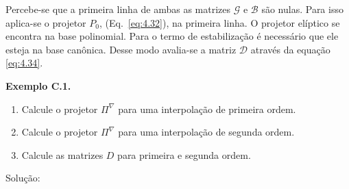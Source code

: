 \indent Percebe-se que a primeira linha de ambas as matrizes $\mathcal{G}$ e $\mathcal{B}$ são nulas. Para isso aplica-se o projetor $P_0$, (Eq.~\ref{eq:4.32}), na primeira linha. O projetor elíptico se encontra na base polinomial. Para o termo de estabilização é necessário que ele esteja na base canônica. Desse modo avalia-se a matriz $\mathcal{D}$ através da equação \ref{eq:4.34}.

\vspace{5mm}
\noindent
\begin{tcolorbox}[breakable, colback=white, colframe=black, boxrule=0.4pt, arc=0pt, outer arc=0pt]
    \vspace{2mm} %
        \textbf{Exemplo C.1.} 
        
        \begin{enumerate}[label=\alph*), leftmargin=*]
            \item Calcule o projetor $\Pi^{\nabla}$ para uma interpolação de primeira ordem.
            \item Calcule o projetor $\Pi^{\nabla}$ para uma interpolação de segunda ordem.
            \item Calcule as matrizes $D$ para primeira e segunda ordem.
        \end{enumerate}
        
        \hrulefill

        Solução: 


\end{tcolorbox}
